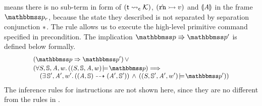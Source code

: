 means there is no sub-term in
form of $({\textsf{t}} \leadsto_{\textsf{c}} {\mathcal{K}})$,
$({\hat{\texttt{rn}}} \rightarrowtail {v})$ and $\llparenthesis {\textit{A}} \rrparenthesis$
in the frame $\relastP_r$,
because the state they described is not separated by
separation conjunction $*$.
The  rule allows us to execute the high-level
primitive command specified in precondition.
The implication $\absExec{\relastP}{\relastP'}$
is defined below formally.
\[
    \small
    \begin{array}{l}
        (\relastP \Rightarrow \relastP') \, \lor \\
        \\[-9.5pt]
        (
            \forall \state, \hpstate, \primcom, \word. \,
            (\asrtmodel{(\state, \hpstate, \primcom, \word)}
                {\relastP}) \Longrightarrow \\
            \quad
            (\exists \, \hpstate', \primcom', \word'. \,
            (\primTrans{(\primcom, \hpstate)}
        	{(\primcom', \hpstate')})
            \, \land \,
            (\asrtmodel{(\state, \hpstate', \primcom', \word')}{\relastP'}))
    \end{array}
\]
The inference rules for instructions are not
shown here, since they are no different from
the rules in \Fig{\ref{fig:Seleted Inference rules}}.

